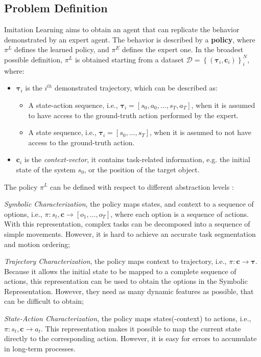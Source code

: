 \subsection{Problem Definition}
\label{sec:problem_formulation}
Imitation Learning aims to obtain an agent that can replicate the behavior demonstrated by an expert agent. The behavior is described by a \textbf{policy}, where $\pi^{L}$ defines the learned policy, and $\pi^{E}$ defines the expert one. In the broadest possible definition, $\pi^{L}$ is obtained starting from a dataset $\mathcal{D}=\left \{ \left ( \boldsymbol{\tau}_{i}, \boldsymbol{c}_{i}\right ) \right \}_{i}^{N}$, where:
\begin{itemize}
    \item $\boldsymbol{\tau}_{i}$ is the $i^{th}$ demonstrated trajectory, which can be described as:
        \begin{itemize}
            \item A state-action sequence, i.e., $\boldsymbol{\tau}_{i} = [s_{0}, a_{0}, \dots, s_{T}, a_{T}]$, when it is assumed to have access to the ground-truth action performed by the expert.
            \item A state sequence, i.e., $\boldsymbol{\tau}_{i} = [s_{0}, \dots, s_{T}]$, when it is assumed to not have access to the ground-truth action.
        \end{itemize}    
    \item $\boldsymbol{c}_{i}$ is the \textit{context-vector}, it contains task-related information, e.g. the initial state of the system $s_{0}$, or the position of the target object.
\end{itemize}
The policy $\pi^{L}$ can be defined with respect to different abstraction levels \cite{fang2019survey,osa2018algorithmic}:   
\begin{enumerate*}[label=(\textbf{\alph*})]
    \item \textit{Symbolic Characterization}, the policy maps states, and context to a sequence of options, i.e., $\pi: s_{t}, \textbf{c} \rightarrow [o_1, \dots, o_T]$, where each option is a sequence of actions. With this representation, complex tasks can be decomposed into a sequence of simple movements. However, it is hard to achieve an accurate task segmentation and motion ordering;
    \item \textit{Trajectory Characterization}, the policy maps context to trajectory, i.e., $\pi: \mathbf{c} \rightarrow \boldsymbol{\tau}$. Because it allows the initial state to be mapped to a complete sequence of actions, this representation can be used to obtain the options in the Symbolic Representation. However, they need as many dynamic features as possible, that can be difficult to obtain;
    \item \textit{State-Action Characterization}, the policy maps states(-context) to actions, i.e., $\pi: s_{t}, \textbf{c} \rightarrow a_{t}$. This representation makes it possible to map the current state directly to the corresponding action. However, it is easy for errors to accumulate in long-term processes.
\end{enumerate*} 
